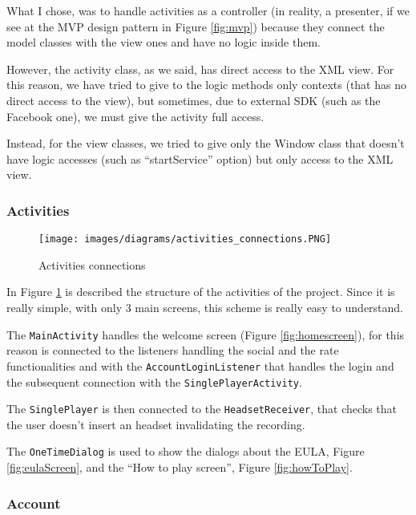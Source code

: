 What I chose, was to handle activities as a controller (in reality, a presenter, if we see at the MVP design pattern in Figure \ref{fig:mvp}) because they connect the model classes with the view ones and have no logic inside them.

However, the activity class, as we said, has direct access to the XML view. For this reason, we have tried to give to the logic methods only contexts (that has no direct access to the view), but sometimes, due to external SDK (such as the Facebook one), we must give the activity full access.

Instead, for the view classes, we tried to give only the Window class that doesn't have logic accesses (such as ``startService'' option) but only access to the XML view.

\subsubsection{Activities} 

\begin{figure}[H]
\centering %
\texttt{[image: images/diagrams/activities\_connections.PNG]}
\caption{Activities connections}
\label{fig:activitiesPlanning}
\end{figure}

In Figure \ref{fig:activitiesPlanning} is described the structure of the activities of the project. Since it is really simple, with only 3 main screens, this scheme is really easy to understand.

The \texttt{MainActivity} handles the welcome screen (Figure \ref{fig:homescreen}), for this reason is connected to the listeners handling the social and the rate functionalities and with the \texttt{AccountLoginListener} that handles the login and the subsequent connection with the \texttt{SinglePlayerActivity}.

The \texttt{SinglePlayer} is then connected to the \texttt{HeadsetReceiver}, that checks that the user doesn't insert an headset invalidating the recording.

The \texttt{OneTimeDialog} is used to show the dialogs about the EULA, Figure \ref{fig:eulaScreen}, and the ``How to play screen'', Figure \ref{fig:howToPlay}.

\subsubsection{Account}

